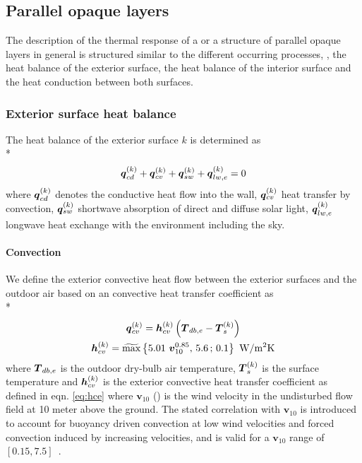 \subsection{Parallel opaque layers}

The description of the thermal response of a  or a structure of parallel opaque layers in general is structured similar to the different occurring processes, \ie, the heat balance of the exterior surface, the heat balance of the interior surface and the heat conduction between both surfaces.

\subsubsection{Exterior surface heat balance}

The heat balance of the exterior surface $k$ is determined as \\*
\begin{equation}
\boldsymbol{q}_{cd}^{(k)} + \boldsymbol{q}_{cv}^{(k)} + \boldsymbol{q}_{sw}^{(k)} + \boldsymbol{q}_{lw,e}^{(k)} = 0
\end{equation}
where $\boldsymbol{q}_{cd}^{(k)}$ denotes the conductive heat flow into the wall, $\boldsymbol{q}_{cv}^{(k)}$ heat transfer by convection, $\boldsymbol{q}_{sw}^{(k)}$ shortwave absorption of direct and diffuse solar light, $\boldsymbol{q}_{lw,e}^{(k)}$ longwave heat exchange with the environment including the sky.

\paragraph{Convection}
We define the exterior convective heat flow between the exterior surfaces and the outdoor air based on an convective heat transfer coefficient as \\*
\begin{gather}
\qflow_{cv}^{\s} = \boldsymbol{h}_{cv}^{\s} \left(\T_{db,e} - \T_{s}^{\s}\right) \label{eq:qcve} \\
\boldsymbol{h}_{cv}^{\s} = \widetilde{\max}\left\{5.01\ \boldsymbol{v}_{10}^{0.85},\,5.6 \, ; \, 0.1\right\} \ \textrm{W}/\textrm{m}^{2}\textrm{K} \label{eq:hce}
\end{gather}
where $\boldsymbol{T}_{db,e}$ is the outdoor dry-bulb air temperature, $\boldsymbol{T}_{s}^{(k)}$ is the surface temperature and $\boldsymbol{h}_{cv}^{(k)}$ is the exterior convective heat transfer coefficient as defined in eqn. \ref{eq:hce} where $\boldsymbol{v}_{10}$ (\metre\per\second) is the wind velocity in the undisturbed flow field at 10 meter above the ground. The stated correlation with $\boldsymbol{v}_{10}$ is introduced to account for buoyancy driven convection at low wind velocities and forced convection induced by increasing velocities, and is valid for a $\boldsymbol{v}_{10}$ range of \mbox{$\left[0.15,7.5\right]$ \metre\per\second}.\citep{Defraeye2011,Jurges1924}


